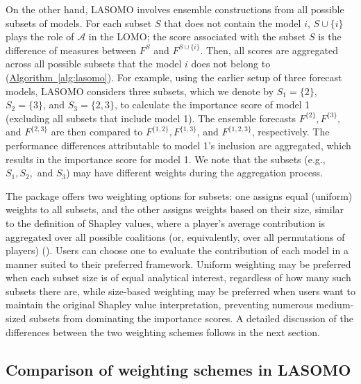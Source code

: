 \documentclass[
  article,
  shortnames,
  notitle]{jss}
\begin{document}
On the other hand, LASOMO involves ensemble constructions from all
possible subsets of models. For each subset \(S\) that does not contain
the model \(i\), \(S \cup \{i\}\) plays the role of \({\mathcal A}\) in
the LOMO; the score associated with the subset \(S\) is the difference
of measures between \(F^S\) and \(F^{S \cup \{i\}}\). Then, all scores
are aggregated across all possible subsets that the model \(i\) does not
belong to (\hyperref[alg:lasomo]{Algorithm~\ref{alg:lasomo}}). For
example, using the earlier setup of three forecast models, LASOMO
considers three subsets, which we denote by \(S_1=\{2\}\),
\(S_2=\{3\}\), and \(S_3=\{2, 3\}\), to calculate the importance score
of model 1 (excluding all subsets that include model 1). The ensemble
forecasts \(F^{\{2\}}, F^{\{3\}}\), and \(F^{\{2,3\}}\) are then
compared to \(F^{\{1,2\}}, F^{\{1,3\}}\), and \(F^{\{1,2,3\}}\),
respectively. The performance differences attributable to model 1's
inclusion are aggregated, which results in the importance score for
model 1. We note that the subsets (e.g., \(S_1, S_2,\) and \(S_3\)) may
have different weights during the aggregation process.

The  package offers two weighting options for
subsets: one assigns equal (uniform) weights to all subsets, and the
other assigns weights based on their size, similar to the definition of
Shapley values, where a player's average contribution is aggregated over
all possible coalitions (or, equivalently, over all permutations of
players) (\citet{Shapley1953}). Users can choose one to evaluate the
contribution of each model in a manner suited to their preferred
framework. Uniform weighting may be preferred when each subset size is
of equal analytical interest, regardless of how many such subsets there
are, while size-based weighting may be preferred when users want to
maintain the original Shapley value interpretation, preventing numerous
medium-sized subsets from dominating the importance scores. A detailed
discussion of the differences between the two weighting schemes follows
in the next section.

\subsection{Comparison of weighting schemes in
LASOMO}\label{sec:comparison-weighting-schemes}
\end{document}
